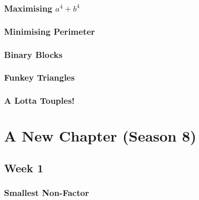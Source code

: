 \documentclass[titlepage=true]{scrartcl}
\begin{document}
        \subsubsection{Maximising \(a^4+b^4\)}
            \label{7-2-3}  
            
        \newpage    

        \subsubsection{Minimising Perimeter}
            \label{7-2-4}
            
        \newpage 

        \subsubsection{Binary Blocks}
            \label{7-2-5}  
            
        \newpage

        \subsubsection{Funkey Triangles}
            \label{7-2-6}  
            
        \newpage

        \subsubsection{A Lotta Touples!}
            \label{7-2-7}  
            
        \newpage
        
\section{A New Chapter (Season 8)}
        
    \subsection{Week 1}

        \subsubsection{Smallest Non-Factor}
            \label{8-1-1}
            
        \newpage
        
\end{document}
